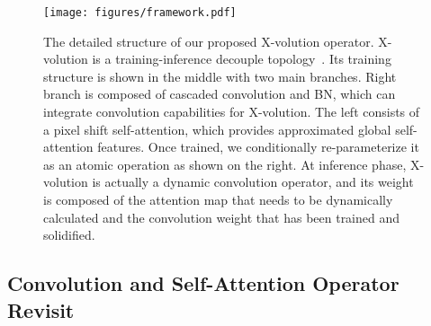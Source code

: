 \documentclass{article}
\begin{document}
\begin{figure}[t]	
    \centering	
	\texttt{[image: figures/framework.pdf]}
	\small
	\caption{The detailed structure of our proposed X-volution operator. X-volution is a training-inference decouple topology~\cite{DBLP:journals/corr/abs-2101-03697}.
	Its training structure is shown in the middle with two main branches.
	Right branch is composed of cascaded convolution and BN, which can integrate convolution capabilities for X-volution.
	The left consists of a pixel shift self-attention, which provides approximated global self-attention features.
	Once trained, we conditionally re-parameterize it as an atomic operation as shown on the right.
	At inference phase, X-volution is actually a dynamic convolution operator, and its weight is composed of the attention map that needs to be dynamically calculated and the convolution weight that has been trained and solidified.
	}
    \label{fig:framework}
\end{figure}

\subsection{Convolution and Self-Attention Operator Revisit}
\end{document}
